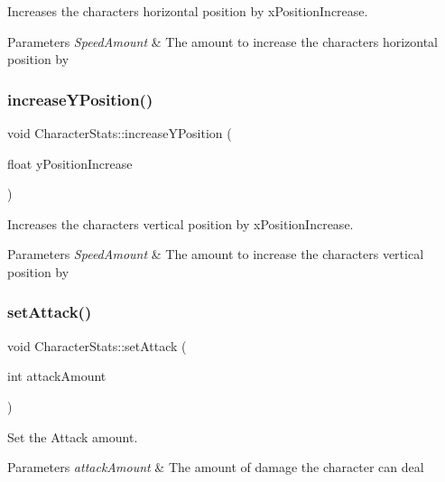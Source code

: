 Increases the characters horizontal position by x\+Position\+Increase. 


\begin{DoxyParams}{Parameters}
{\em Speed\+Amount} & The amount to increase the characters horizontal position by \\
\hline
\end{DoxyParams}
\mbox{\label{classCharacterStats_a991c8cf5304f633dcbce921b3daebbc4}} 
\subsubsection{\texorpdfstring{increaseYPosition()}{increaseYPosition()}}
{\footnotesize\ttfamily void Character\+Stats\+::increase\+Y\+Position (\begin{DoxyParamCaption}\item[{float}]{y\+Position\+Increase }\end{DoxyParamCaption})}



Increases the characters vertical position by x\+Position\+Increase. 


\begin{DoxyParams}{Parameters}
{\em Speed\+Amount} & The amount to increase the characters vertical position by \\
\hline
\end{DoxyParams}
\mbox{\label{classCharacterStats_a67bfa42fdaecd66ad03786a44e45874c}} 
\subsubsection{\texorpdfstring{setAttack()}{setAttack()}}
{\footnotesize\ttfamily void Character\+Stats\+::set\+Attack (\begin{DoxyParamCaption}\item[{int}]{attack\+Amount }\end{DoxyParamCaption})\hspace{0.3cm}{\ttfamily [inline]}}



Set the Attack amount. 


\begin{DoxyParams}{Parameters}
{\em attack\+Amount} & The amount of damage the character can deal \\
\hline
\end{DoxyParams}
\mbox{\label{classCharacterStats_ab5382a7eab127aeb603de23d51877099}} 
